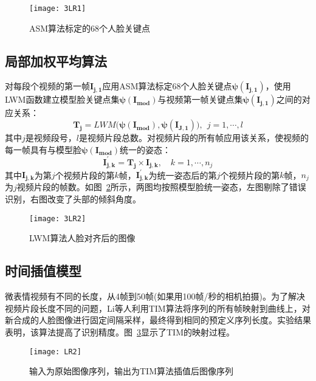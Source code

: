 \begin{figure}[!htbp]
\centering
\texttt{[image: 3LR1]}
\caption{ASM算法标定的68个人脸关键点}
\label{fig12}
\end{figure}

\subsection{局部加权平均算法}

对每段个视频的第一帧$\boldsymbol{I_{j,1}}$应用ASM算法标定68个人脸关键点$\boldsymbol{\psi (I_{j,1})}$，使用LWM函数建立模型脸关键点集$\boldsymbol{\psi (I_{mod})}$与视频第一帧关键点集$\boldsymbol{\psi (I_{j,1})}$之间的对应关系：
\begin{equation}
    \label{eq3}
    \boldsymbol{T_{j}}=LWM(\boldsymbol{\psi (I_{mod})},\boldsymbol{\psi (I_{J,1}))},~~j=1,\cdots ,l
\end{equation}
其中$j$是视频段号，$l$是视频片段总数。对视频片段的所有帧应用该关系，使视频的每一帧具有与模型脸$\boldsymbol{\psi (I_{mod})}$统一的姿态：
\begin{equation}
    \label{eq3}
    \boldsymbol{I_{j,k}^{'}}=\boldsymbol{T_{j}}\times \boldsymbol{I_{j,k}},\quad k=1,\cdots ,n_{j}
\end{equation}
其中$\boldsymbol{I_{j,k}}$为第$j$个视频片段的第$k$帧，$\boldsymbol{I_{j,k}^{'}}$为统一姿态后的第$j$个视频片段的第$k$帧，$n_{j}$为$j$视频片段的帧数。如图~\ref{fig13}所示，两图均按照模型脸统一姿态，左图剔除了错误识别，右图改变了头部的倾斜角度。

\begin{figure}[!htbp]
\centering
\texttt{[image: 3LR2]}
\caption{LWM算法人脸对齐后的图像}
\label{fig13}
\end{figure}

\subsection{时间插值模型}

微表情视频有不同的长度，从4帧到50帧(如果用100帧/秒的相机拍摄)。为了解决视频片段长度不同的问题，Li等人利用TIM算法将序列的所有帧映射到曲线上，对新合成的人脸图像进行固定间隔采样，最终得到相同的预定义序列长度。实验结果表明，该算法提高了识别精度。图~\ref{fig14}显示了TIM的映射过程\citep{zhou2011towards}。

\begin{figure}[!htbp]
\centering
\texttt{[image: LR2]}
\caption{输入为原始图像序列，输出为TIM算法插值后图像序列}
\label{fig14}
\end{figure}

